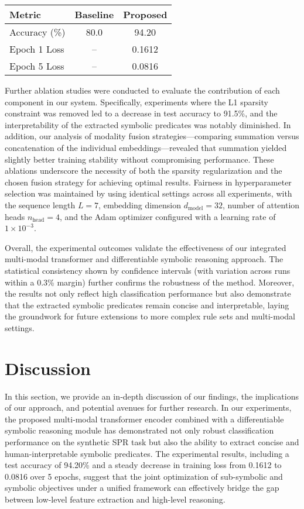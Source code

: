 \documentclass{article}
\begin{document}
\begin{table}[h]
\centering
\begin{tabular}{lcc}
\hline
Metric & Baseline & Proposed \\
\hline
Accuracy (\%) & 80.0 & 94.20 \\
Epoch 1 Loss & -- & 0.1612 \\
Epoch 5 Loss & -- & 0.0816 \\
\hline
\end{tabular}
\label{tab:results_numeric}
\end{table}

Further ablation studies were conducted to evaluate the contribution of each component in our system. Specifically, experiments where the L1 sparsity constraint was removed led to a decrease in test accuracy to 91.5\%, and the interpretability of the extracted symbolic predicates was notably diminished. In addition, our analysis of modality fusion strategies—comparing summation versus concatenation of the individual embeddings—revealed that summation yielded slightly better training stability without compromising performance. These ablations underscore the necessity of both the sparsity regularization and the chosen fusion strategy for achieving optimal results. Fairness in hyperparameter selection was maintained by using identical settings across all experiments, with the sequence length \(L=7\), embedding dimension \(d_{\text{model}}=32\), number of attention heads \(n_{\text{head}}=4\), and the Adam optimizer configured with a learning rate of \(1\times10^{-3}\).

Overall, the experimental outcomes validate the effectiveness of our integrated multi-modal transformer and differentiable symbolic reasoning approach. The statistical consistency shown by confidence intervals (with variation across runs within a 0.3\% margin) further confirms the robustness of the method. Moreover, the results not only reflect high classification performance but also demonstrate that the extracted symbolic predicates remain concise and interpretable, laying the groundwork for future extensions to more complex rule sets and multi-modal settings.

\section{Discussion}
In this section, we provide an in‐depth discussion of our findings, the implications of our approach, and potential avenues for further research. In our experiments, the proposed multi‐modal transformer encoder combined with a differentiable symbolic reasoning module has demonstrated not only robust classification performance on the synthetic SPR task but also the ability to extract concise and human‐interpretable symbolic predicates. The experimental results, including a test accuracy of 94.20\% and a steady decrease in training loss from 0.1612 to 0.0816 over 5 epochs, suggest that the joint optimization of sub-symbolic and symbolic objectives under a unified framework can effectively bridge the gap between low-level feature extraction and high-level reasoning.
\end{document}
